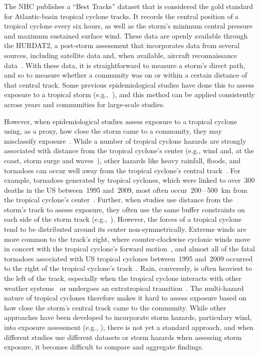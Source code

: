 The \ac{NHC} publishes a ``Best Tracks'' dataset that is considered the gold
standard for Atlantic-basin tropical cyclone tracks.  It records the central
position of a tropical cyclone every six hours, as well as the storm's minimum
central pressure and maximum sustained surface wind.  These data are openly
available through the \ac{HURDAT2}, a post-storm assessment that incorporates
data from several sources, including satellite data and, when available,
aircraft reconnaissance data~\parencite{landsea2013, jarvinen1988}.  With these
data, it is straightforward to measure a storm's direct path, and so to measure
whether a community was on or within a certain distance of that central track.
Some previous epidemiological studies have done this to assess exposure to a
tropical storm (e.g.,~\cite{currie2013, kinney2008, caillouet2008increase}), 
and this method can be applied consistently across years and communities 
for large-scale studies.

However, when epidemiological studies assess exposure to a tropical cyclone
using, as a proxy, how close the storm came to a community, they may
misclassify exposure~\parencite{grabich2015measuring}. While a number of
tropical cyclone hazards are strongly associated with distance from the
tropical cyclone's center (e.g., wind and, at the coast, storm surge and
waves~\parencite{rappaport2000, kruk2010}), other hazards like heavy rainfall,
floods, and tornadoes can occur well away from the tropical cyclone's central
track~\parencite{rappaport2000, atallah2007, moore2012}.  For example,
tornadoes generated by tropical cyclones, which were linked to over~300 deaths
in the \ac{US} between~1995 and~2009, most often
occur~200\,--\,500~\si{\kilo\metre} from the tropical cyclone's
center~\parencite{moore2012}.  Further, when studies use distance from the
storm's track to assess exposure, they often use the same buffer constraints on
each side of the storm track (e.g.,~\cite{kinney2008, currie2013}).  However,
the forces of a tropical cyclone tend to be distributed around its center
non-symmetrically.  Extreme winds are more common to the track's right, where
counter-clockwise cyclonic winds move in concert with the tropical cyclone's
forward motion~\parencite{halverson2015}, and almost all of the fatal tornadoes
associated with \ac{US} tropical cyclones between~1995 and~2009 occurred to the
right of the tropical cyclone's track~\parencite{moore2012}. Rain, conversely,
is often heaviest to the left of the track, especially when the tropical
cyclone interacts with other weather systems~\parencite{atallah2003,
atallah2007, zhu2013variations} or undergoes an extratropical
transition~\parencite{elsberry2002}.  The multi-hazard nature of tropical
cyclones therefore makes it hard to assess exposure based on how close the
storm's central track came to the community.  While other approaches have been
developed to incorporate storm hazards, particulary wind, into exposure
assessment (e.g., \cite{grabich2015measuring, zandbergen2009, czajkowski2011}),
there is not yet a standard approach, and when different studies use
different datasets or storm hazards when assessing storm exposure, it becomes
difficult to compare and aggregate findings. 

